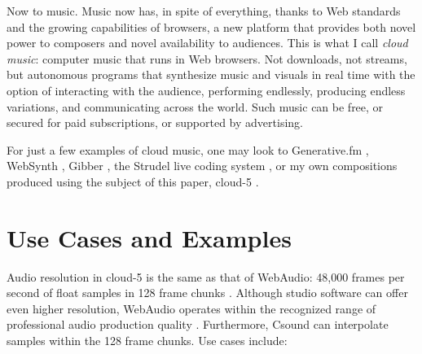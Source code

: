 \documentclass[runningheads,a4paper]{llncs}
\begin{document}
Now to music. Music now has, in spite of everything, thanks to Web standards and the growing capabilities of browsers, a new platform that provides both novel power to composers and novel availability to audiences. This is what I call \emph{cloud music}: computer music that runs in Web browsers. Not downloads, not streams, but autonomous programs that synthesize music and visuals in real time with the option of interacting with the audience, performing endlessly, producing endless variations, and communicating across the world. Such music can be free, or secured for paid subscriptions, or supported by advertising. 

For just a few examples of cloud music, one may look to Generative.fm \cite{alexbainter}, WebSynth \cite{websynth}, Gibber \cite{gibber}, the Strudel live coding system \cite{strudel}, or my own compositions produced using the subject of this paper, cloud-5 \cite{cloud5}.

\section{Use Cases and Examples}

Audio resolution in cloud-5 is the same as that of WebAudio: 48,000 frames per second of float samples in 128 frame chunks \cite{webaudiostandard}. Although studio software can offer even higher resolution, WebAudio operates within the recognized range of professional audio production quality \cite{katz} \cite{bassal}. Furthermore, Csound can interpolate samples within the 128 frame chunks. Use cases include:
\end{document}
